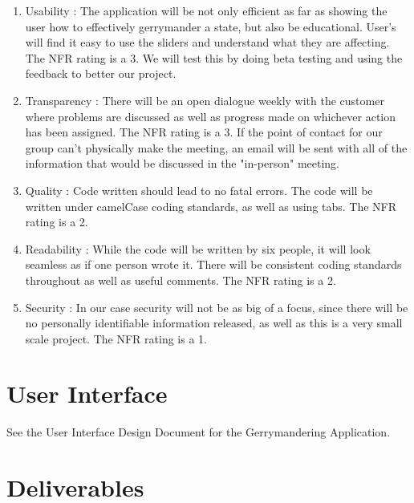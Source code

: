 \documentclass{article}
\begin{document}
\begin{addmargin}[2em]{0em}
\begin{enumerate}
\item Usability : The application will be not only efficient as far as showing the user how to effectively gerrymander a state, but also be educational. User's will find it easy to use the sliders and understand what they are affecting. The NFR rating is a 3. We will test this by doing beta testing and using the feedback to better our project. 

\item Transparency : There will be an open dialogue weekly with the customer where problems are discussed as well as progress made on whichever action has been assigned. The NFR rating is a 3. If the point of contact for our group can't physically make the meeting, an email will be sent with all of the information that would be discussed in the "in-person" meeting.

\item Quality : Code written should lead to no fatal errors. The code will be written under camelCase coding standards, as well as using tabs. The NFR rating is a 2.

\item Readability : While the code will be written by six people, it will look seamless as if one person wrote it. There will be consistent coding standards throughout as well as useful comments. The NFR rating is a 2.

\item Security : In our case security will not be as big of a focus, since there will be no personally identifiable information released, as well as this is a very small scale project. The NFR rating is a 1.

\end{enumerate}
\end{addmargin}


\section{User Interface}\label{sec:ui}
\vspace{2.5mm}

See the User Interface Design Document for the Gerrymandering Application.

\vspace{2.5mm}
\section{Deliverables}\label{sec:deliverables}
\end{document}
